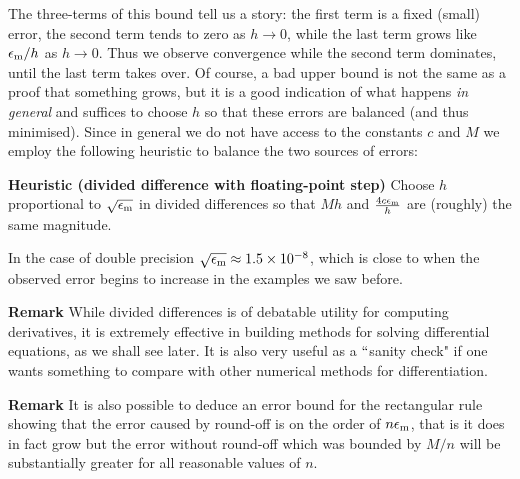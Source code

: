 The three-terms of this bound tell us a story: the first term is a fixed (small) error, the second term tends to zero as $h \rightarrow 0$, while the last term grows like $\ensuremath{\epsilon}_{\rm m}/h$ as $h \rightarrow 0$.  Thus we observe convergence while the second term dominates, until the last term takes over. Of course, a bad upper bound is not the same as a proof that something grows, but it is a good indication of what happens \emph{in general} and suffices to choose $h$ so that these errors are balanced (and thus minimised). Since in general we do not have access to the constants $c$ and $M$ we employ the following heuristic to balance the two sources of errors:

\textbf{Heuristic (divided difference with floating-point step)} Choose $h$ proportional to $\sqrt{\ensuremath{\epsilon}_{\rm m}}$ in divided differences  so that $M h$ and ${4c \ensuremath{\epsilon}_{\rm m} \over h}$ are (roughly) the same magnitude.

In the case of double precision $\sqrt{\ensuremath{\epsilon}_{\rm m}} \ensuremath{\approx} 1.5\ensuremath{\times} 10^{-8}$, which is close to when the observed error begins to increase in the examples we saw before.

\textbf{Remark} While divided differences is of debatable utility for computing derivatives, it is extremely effective in building methods for solving differential equations, as we shall see later. It is also very useful as a \ensuremath{\ldq}sanity check" if one wants something to compare with other numerical methods for differentiation.

\textbf{Remark} It is also possible to deduce an error bound for the rectangular rule showing that the error caused by round-off is on the order of $n \ensuremath{\epsilon}_{\rm m}$, that is it does in fact grow but the error without round-off which was bounded by $M/n$ will be substantially greater for all reasonable values of $n$.




